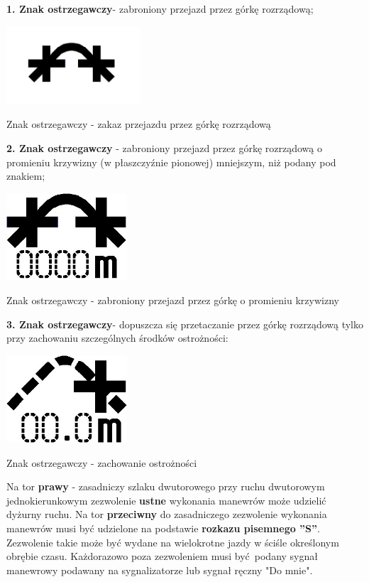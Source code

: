 \textbf{1. Znak ostrzegawczy}- zabroniony przejazd przez górkę rozrządową;
\begin{marginfigure}
	\includegraphics[width=5cm]{skryptkierownik-img/skryptkierownik-img024.jpg}
	\caption{Znak ostrzegawczy - zakaz przejazdu przez górkę rozrządową}
\end{marginfigure}
{\color{black}
\textbf{2. Znak ostrzegawczy} - zabroniony przejazd przez górkę rozrządową o promieniu krzywizny (w płaszczyźnie pionowej) mniejszym, niż podany pod znakiem;}
\begin{marginfigure}
	\includegraphics[width=4.5cm]{skryptkierownik-img/skryptkierownik-img025.jpg}
	\caption{Znak ostrzegawczy - zabroniony przejazd przez górkę o promieniu krzywizny}
\end{marginfigure}
\textbf{3. Znak ostrzegawczy}- dopuszcza się przetaczanie przez górkę rozrządową tylko przy zachowaniu szczególnych środków ostrożności:
\begin{marginfigure}
	\includegraphics[width=4.5cm]{skryptkierownik-img/skryptkierownik-img026.jpg}
	\caption{Znak ostrzegawczy - zachowanie ostrożności}
\end{marginfigure}

Na tor \textbf{prawy} - zasadniczy szlaku dwutorowego przy ruchu dwutorowym jednokierunkowym zezwolenie \textbf{ustne} wykonania manewrów może udzielić dyżurny ruchu. Na tor \textbf{przeciwny} do zasadniczego zezwolenie wykonania manewrów musi być udzielone na podstawie \textbf{rozkazu pisemnego ''S''}. Zezwolenie takie może być wydane na wielokrotne jazdy w ściśle określonym obrębie czasu. Każdorazowo poza zezwoleniem musi być podany sygnał manewrowy podawany na sygnalizatorze lub sygnał ręczny "Do mnie".

